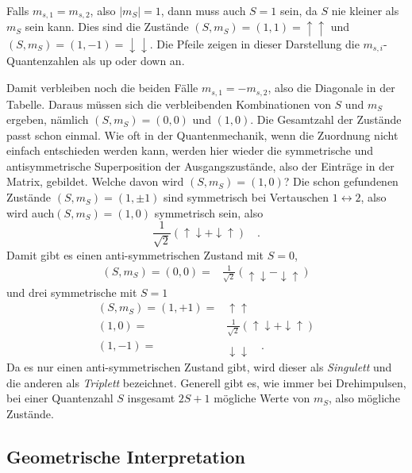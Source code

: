Falls $m_{s,1} = m_{s,2}$, also $|m_S| = 1$, dann muss auch $S = 1$ sein, da $S$ nie kleiner als $m_S$ sein kann. Dies sind die Zustände  $(S, m_S) = (1,1) = \uparrow\uparrow$ und  $(S, m_S) = (1,-1) = \downarrow\downarrow$. Die Pfeile zeigen in dieser Darstellung die  $m_{s,i}$-Quantenzahlen als up oder down an.

Damit verbleiben noch die beiden Fälle $m_{s,1} = - m_{s,2}$, also die Diagonale in der Tabelle. Daraus müssen sich die verbleibenden Kombinationen von $S$ und $m_S$ ergeben, nämlich $(S, m_S) = (0,0)$ und $(1,0)$. Die Gesamtzahl der Zustände passt schon einmal. Wie oft in der Quantenmechanik, wenn die Zuordnung nicht einfach entschieden werden kann, werden hier wieder die symmetrische und antisymmetrische Superposition der Ausgangszustände, also der Einträge in der Matrix, gebildet. Welche davon wird  $(S, m_S) = (1,0)$? Die schon gefundenen Zustände $(S, m_S) = (1,\pm1) $ sind symmetrisch bei Vertauschen $1 \leftrightarrow 2$, also wird auch$(S, m_S) = (1,0)$ symmetrisch sein, also 
\begin{equation}
   \frac{1}{\sqrt{2}} \left(  \uparrow \downarrow  +  \downarrow \uparrow \right) \quad .
\end{equation}
Damit gibt es einen anti-symmetrischen Zustand mit $S = 0$, 
\begin{align}
    (S, m_S) = (0, 0)  = & \frac{1}{\sqrt{2}} \left(  \uparrow \downarrow -  \downarrow \uparrow \right) 
\end{align}
und drei symmetrische mit $S=1$
\begin{align}
    (S, m_S) =  (1, +1) =& \uparrow \uparrow  \\
  (1, 0) = & \frac{1}{\sqrt{2}} \left( \uparrow \downarrow +  \downarrow \uparrow \right) \\
  (1, -1) = &\downarrow \downarrow   \quad .
\end{align}
Da es nur einen anti-symmetrischen Zustand gibt, wird dieser als \emph{Singulett} und die anderen als \emph{Triplett} bezeichnet. Generell gibt es, wie immer bei Drehimpulsen, bei einer Quantenzahl $S$ insgesamt $2S+1$ mögliche Werte von $m_S$, also mögliche Zustände.

\subsection{Geometrische Interpretation}

